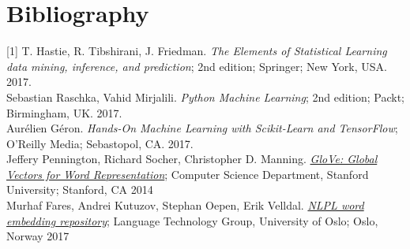 \section{Bibliography}
\label{chap:Bibliography}

\label{Bib:T. Hastie, R. Tibshirani, J. Friedman}[1] T. Hastie, R. Tibshirani, J. Friedman. \textit{The Elements of Statistical Learning data mining, inference, and prediction}; 2nd edition; Springer; New York, USA. 2017.\\

\label{Bib:Sebastian Raschka, Vahid Mirjalili}\noindent [2] Sebastian Raschka, Vahid Mirjalili. \textit{Python Machine Learning}; 2nd edition; Packt; Birmingham, UK. 2017.\\

\label{Bib:Aurelien Geron}\noindent [3] Aurélien Géron. \textit{Hands-On Machine Learning with Scikit-Learn and TensorFlow}; O'Reilly Media; Sebastopol, CA. 2017.\\


\label{Bib:Pennington Socher Manning}\noindent [4] Jeffery Pennington, Richard Socher, Christopher D. Manning.  \href{https://nlp.stanford.edu/pubs/glove.pdf}{\textit{GloVe: Global Vectors for Word Representation}}; Computer Science Department, Stanford University; Stanford, CA 2014 \\


\label{Bib:embeddingrepo}\noindent [5] Murhaf Fares, Andrei Kutuzov, Stephan Oepen, Erik Velldal.  \href{http://vectors.nlpl.eu/repository/}{\textit{NLPL word embedding repository}}; Language Technology Group, University of Oslo; Oslo, Norway 2017 \\

